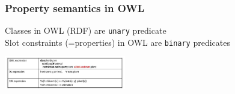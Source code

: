\subsubsection{Property semantics in OWL}
Classes in OWL (RDF) are \texttt{unary} predicate \\
Slot constraints (=properties) in OWL are \texttt{binary} predicates
\includegraphics[width=200px, height=80px]{owlsemantics}

\item
